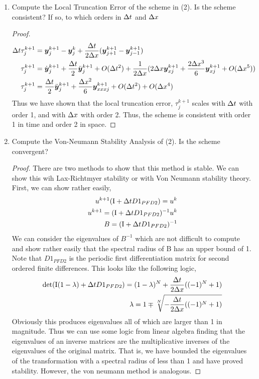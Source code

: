 \documentclass{article}
\begin{document}
\begin{enumerate}[label=\alph*)]

    \item Compute the Local Truncation Error of the scheme in (2). Is the scheme
    consistent? If so, to which orders in $\Delta t$ and $\Delta x$
    \begin{proof}
        \begin{align*}
            \Delta t \tau_j^{k+1} &= \boldsymbol{y}_j^{k+1} - \boldsymbol{y}_j^k + \frac{\Delta t}{2\Delta x}(\boldsymbol{y}_{j+1}^{k+1}
            - \boldsymbol{y}_{j-1}^{k+1})\\
            \tau_j^{k+1} &= \dot{\boldsymbol{y}}_j^{k+1} + \frac{\Delta t}{2}\ddot{\boldsymbol{y}}_j^{k+1} +
            O(\Delta t^2) + 
            \frac{1}{2\Delta x}(2\Delta x \boldsymbol{y}_{x j}^{k+1} + \frac{2\Delta x^3}{6} \boldsymbol{y}_{x j}^{k+1}
            +O(\Delta x^5))\\
            \tau_j^{k+1} &= \frac{\Delta t}{2}\ddot{\boldsymbol{y}}_j^{k+1} +
            \frac{\Delta x^2}{6} \boldsymbol{y}_{xxx j}^{k+1} + O(\Delta t^2)+O(\Delta x^4) 
        \end{align*}
        Thus we have shown that the local truncation error, $\tau_j^{k+1}$
        scales with $\Delta t$ with order 1, and with $\Delta x$ with order 2. Thus, the
        scheme is consistent with order 1 in time and order 2 in space. 
    \end{proof}

    \item Compute the Von-Neumann Stability Analysis of (2). Is the scheme
    convergent?
    \begin{proof}
        There are two methods to show that this method is stable. We can show
        this wih Lax-Richtmyer stability or with Von Neumann stability theory.
        First, we can show rather easily, 
        \begin{align*}
            u^{k+1} (\mathrm{I} + \Delta t D1_{PFD2}) = u^{k}\\
            u^{k+1} =  (\mathrm{I} + \Delta t D1_{PFD2})^{-1} u^{k}\\
            B = (\mathrm{I} + \Delta t D1_{PFD2})^{-1}
        \end{align*}
        We can consider the eigenvalues of $B^{-1}$ which are not difficult to
        compute and show rather easily that the spectral radius of B has an
        upper bound of 1. Note that $D1_{PFD2}$ is the periodic first differentiation
        matrix for second ordered finite differences. This looks like the following logic,
        \begin{align*}
            \det(\mathrm{I}(1-\lambda) + \Delta t D1_{PFD2}) = (1 -\lambda)^N +
            \frac{\Delta t}{2\Delta x}((-1)^N + 1)\\
            \lambda = 1 \mp \sqrt[N]{-\frac{\Delta t}{2\Delta x}((-1)^N + 1)}
        \end{align*}
        Obviously this produces eigenvalues all of which are larger than 1 in
        magnitude. Thus we can use some logic from linear algebra finding that
        the eigenvalues of an inverse matrices are the multiplicative inverses
        of the eigenvalues of the original matrix. That is, we have bounded the
        eigenvalues of the transformation with a spectral radius of less than 1
        and have proved stability. However, the von neumann method is analogous.


\end{proof}
\end{enumerate}
\end{document}
